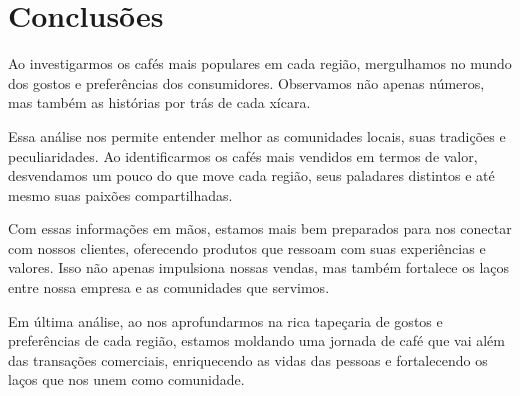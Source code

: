 \chapter{Conclusões}
\label{ch:conclusao}
	Ao investigarmos os cafés mais populares em cada região, mergulhamos no mundo dos gostos e preferências dos consumidores. Observamos não apenas números, mas também as histórias por trás de cada xícara.

Essa análise nos permite entender melhor as comunidades locais, suas tradições e peculiaridades. Ao identificarmos os cafés mais vendidos em termos de valor, desvendamos um pouco do que move cada região, seus paladares distintos e até mesmo suas paixões compartilhadas.

Com essas informações em mãos, estamos mais bem preparados para nos conectar com nossos clientes, oferecendo produtos que ressoam com suas experiências e valores. Isso não apenas impulsiona nossas vendas, mas também fortalece os laços entre nossa empresa e as comunidades que servimos.

Em última análise, ao nos aprofundarmos na rica tapeçaria de gostos e preferências de cada região, estamos moldando uma jornada de café que vai além das transações comerciais, enriquecendo as vidas das pessoas e fortalecendo os laços que nos unem como comunidade.